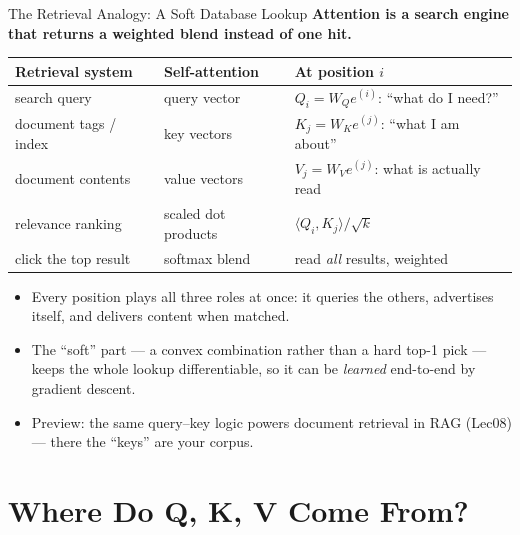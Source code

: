\begin{frame}{The Retrieval Analogy: A Soft Database Lookup}
\textbf{Attention is a search engine that returns a weighted blend instead of one hit.}
\begin{center}
\renewcommand{\arraystretch}{1.3}
\footnotesize
\begin{tabular}{l l l}
\toprule
\textbf{Retrieval system} & \textbf{Self-attention} & \textbf{At position $i$} \\
\midrule
search query & query vector & $Q_i = W_Q e^{(i)}$: ``what do I need?'' \\
document tags / index & key vectors & $K_j = W_K e^{(j)}$: ``what I am about'' \\
document contents & value vectors & $V_j = W_V e^{(j)}$: what is actually read \\
relevance ranking & scaled dot products & $\langle Q_i, K_j\rangle/\sqrt{k}$ \\
click the top result & softmax blend & read \emph{all} results, weighted \\
\bottomrule
\end{tabular}
\end{center}
\medskip
\begin{itemize}
\item Every position plays all three roles at once: it queries the others, advertises itself, and delivers content when matched.
\item The ``soft'' part --- a convex combination rather than a hard top-1 pick --- keeps the whole lookup differentiable, so it can be \emph{learned} end-to-end by gradient descent.
\item Preview: the same query--key logic powers document retrieval in RAG (Lec08) --- there the ``keys'' are your corpus.
\end{itemize}
\end{frame}

\section{Where Do Q, K, V Come From?}

